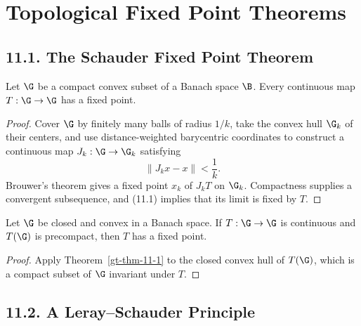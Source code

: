 \chapter{Topological Fixed Point Theorems}

\section*{11.1. The Schauder Fixed Point Theorem}

\begin{theorem}
\label{gt-thm-11-1}
Let $\G$ be a compact convex subset of a Banach space $\B$. Every continuous
map $T:\G\to\G$ has a fixed point.
\end{theorem}
\begin{proof}
\sketch Cover $\G$ by finitely many balls of radius $1/k$, take the convex
hull $\G_k$ of their centers, and use distance-weighted barycentric
coordinates to construct a continuous map $J_k:\G\to\G_k$ satisfying
\begin{equation}
\tag{11.1}
\|J_kx-x\|<\frac1k.
\end{equation}
Brouwer's theorem gives a fixed point $x_k$ of $J_kT$ on $\G_k$.
Compactness supplies a convergent subsequence, and (11.1) implies that its
limit is fixed by $T$.
\end{proof}

\begin{corollary}
\label{gt-cor-11-2}
Let $\G$ be closed and convex in a Banach space. If $T:\G\to\G$ is
continuous and $T(\G)$ is precompact, then $T$ has a fixed point.
\end{corollary}
\begin{proof}
\sketch Apply Theorem~\ref{gt-thm-11-1} to the closed convex hull of
$T(\G)$, which is a compact subset of $\G$ invariant under $T$.
\end{proof}

\section*{11.2. A Leray--Schauder Principle}


